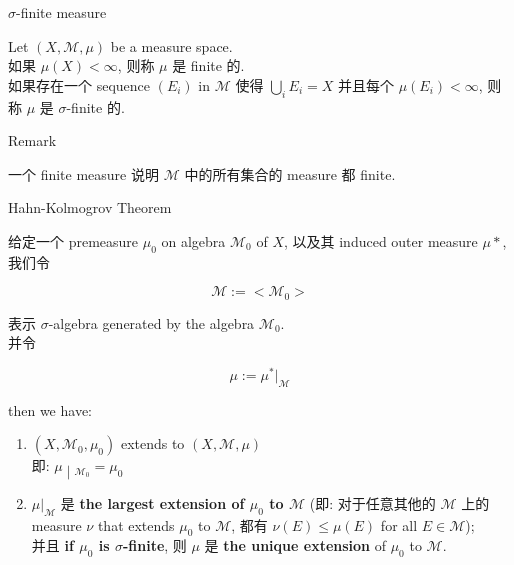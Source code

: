 \documentclass{qlnotes-export}
\begin{document}
\begin{definition}{\(\sigma\)-finite measure}\label{def-02-outer-measure-completion-of-a-measurable-space-sigma-finite-measure}

Let \((X,\mathcal{M},\mu)\) be a measure space.\\
如果 \(\mu(X) < \infty\), 则称 \(\mu\) 是 finite 的.\\
如果存在一个 sequence \((E_{i})\) in \(\mathcal{M}\) 使得 \(\bigcup_{i}E_{i} = X\) 并且每个 \(\mu(E_{i}) < \infty\), 则称 \(\mu\) 是 \(\sigma\)-finite 的.

\end{definition}

\begin{qlremark}{Remark}

一个 finite measure 说明 \(\mathcal{M}\) 中的所有集合的 measure 都 finite.

\end{qlremark}

\begin{theorem}{Hahn-Kolmogrov Theorem}\label{thm-02-outer-measure-completion-of-a-measurable-space-hahn-kolmogrov-theorem}

给定一个 premeasure \(\mu_{0}\) on algebra \(\mathcal{M}_{0}\) of \(X\), 以及其 induced outer measure \(\mu \ast\), 我们令

\[\mathcal{M} := < \mathcal{M}_{0} >\]

表示 \(\sigma\)-algebra generated by the algebra \(\mathcal{M}_{0}\).\\
并令

\[\mu := \mu^{\ast}|_{\mathcal{M}}\]

then we have:

\begin{enumerate}
\item
  \((X,\mathcal{M}_{0},\mu_{0})\) extends to \((X,\mathcal{M},\mu)\)\\
  即: \(\left. \mu \middle| {}_{\mathcal{M}_{0}} = \mu_{0} \right.\)
\item
  \(\mu|_{\mathcal{M}}\) 是 \textbf{the largest extension of \(\mu_{0}\) to \(\mathcal{M}\)} (即: 对于任意其他的 \(\mathcal{M}\) 上的 measure \(\nu\) that extends \(\mu_{0}\) to \(\mathcal{M}\), 都有 \(\nu(E) \leq \mu(E)\) for all \(E \in \mathcal{M}\));\\
  并且 \textbf{if \(\mu_{0}\) is \(\sigma\)-finite}, 则 \(\mu\) 是 \textbf{the unique extension} of \(\mu_{0}\) to \(\mathcal{M}\).
\end{enumerate}

\end{theorem}
\end{document}
